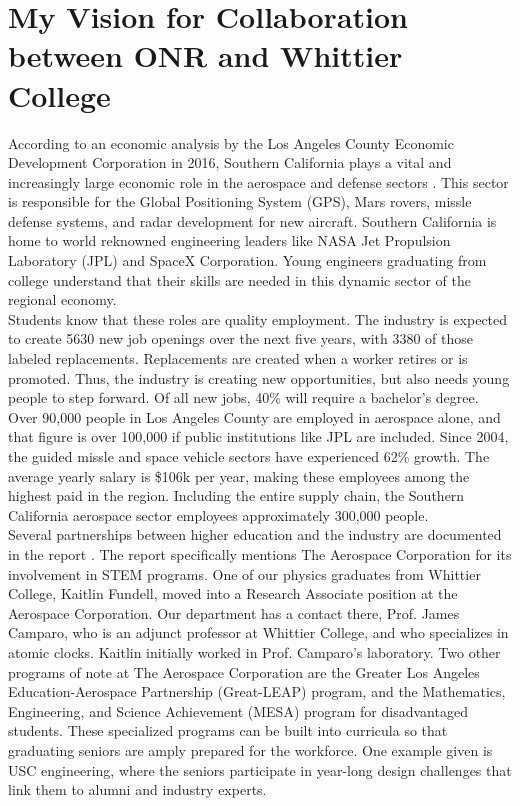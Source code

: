 \documentclass[../../../main.tex]{subfiles}
\begin{document}
\section{My Vision for Collaboration between ONR and Whittier College}
\label{sec:naval_collaboration}

According to an economic analysis by the Los Angeles County Economic Development Corporation in 2016, Southern California plays a vital and increasingly large economic role in the aerospace and defense sectors \cite{laedc}.  This sector is responsible for the Global Positioning System (GPS), Mars rovers, missle defense systems, and radar development for new aircraft.  Southern California is home to world reknowned engineering leaders like NASA Jet Propulsion Laboratory (JPL) and SpaceX Corporation.  Young engineers graduating from college understand that their skills are needed in this dynamic sector of the regional economy.
\\
\vspace{0.25cm}
Students know that these roles are quality employment.  The industry is expected to create 5630 new job openings over the next five years, with 3380 of those labeled replacements.  Replacements are created when a worker retires or is promoted.  Thus, the industry is creating new opportunities, but also needs young people to step forward.  Of all new jobs, 40\% will require a bachelor's degree.  Over 90,000 people in Los Angeles County are employed in aerospace alone, and that figure is over 100,000 if public institutions like JPL are included.  Since 2004, the guided missle and space vehicle sectors have experienced 62\% growth.  The average yearly salary is \$106k per year, making these employees among the highest paid in the region.  Including the entire supply chain, the Southern California aerospace sector employees approximately 300,000 people.
\\
\vspace{0.25cm}
Several partnerships between higher education and the industry are documented in the report \cite{laedc}.  The report specifically mentions The Aerospace Corporation for its involvement in STEM programs.  One of our physics graduates from Whittier College, Kaitlin Fundell, moved into a Research Associate position at the Aerospace Corporation.  Our department has a contact there, Prof. James Camparo, who is an adjunct professor at Whittier College, and who specializes in atomic clocks.  Kaitlin initially worked in Prof. Camparo's laboratory.  Two other programs of note at The Aerospace Corporation are the Greater Los Angeles Education-Aerospace Partnership (Great-LEAP) program, and the Mathematics, Engineering, and Science Achievement (MESA) program for disadvantaged students.  These specialized programs can be built into curricula so that graduating seniors are amply prepared for the workforce.  One example given is USC engineering, where the seniors participate in year-long design challenges that link them to alumni and industry experts.
\end{document}
